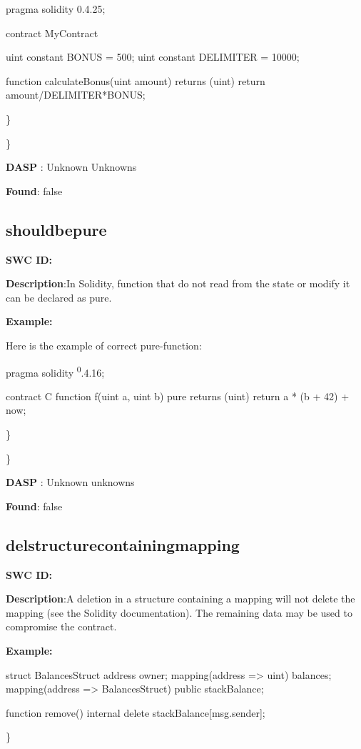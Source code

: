 \documentclass{article}
\begin{document}
{pragma solidity 0.4.25;

contract MyContract {

    uint constant BONUS = 500;
    uint constant DELIMITER = 10000;

    function calculateBonus(uint amount) returns (uint) {
        return amount/DELIMITER*BONUS;
    }
}

\} 

\} 

\textbf{DASP} : Unknown Unknowns

\textbf{Found}: false

\subsection{should\textunderscore be\textunderscore pure} 
\textbf{SWC \textunderscore ID:} 

\textbf{Description}:In Solidity, function that do not read from the state or modify it can be declared as pure.


\textbf{Example:} 

Here is the example of correct pure-function:

pragma solidity \textsuperscript0.4.16;

contract C {
    function f(uint a, uint b) pure returns (uint) {
        return a * (b + 42) + now;
    }
}

\} 

\} 

\textbf{DASP} : Unknown unknowns

\textbf{Found}: false

\subsection{del\textunderscore structure\textunderscore containing\textunderscore mapping} 
\textbf{SWC \textunderscore ID:} 

\textbf{Description}:A deletion in a structure containing a mapping will not delete the mapping (see the Solidity documentation). The remaining data may be used to compromise the contract.


\textbf{Example:} 

struct BalancesStruct{
    address owner;
    mapping(address => uint) balances;
}
mapping(address => BalancesStruct) public stackBalance;

function remove() internal{
      delete stackBalance[msg.sender];
}

\} 

}
\end{document}
